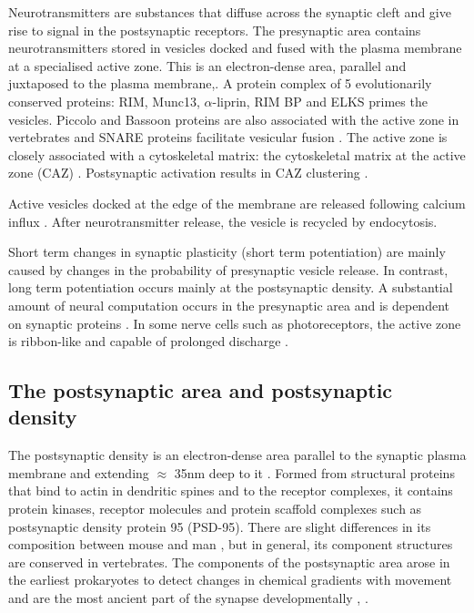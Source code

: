 Neurotransmitters are substances that diffuse across the synaptic cleft and give rise to signal in the postsynaptic receptors. 
 The presynaptic area contains neurotransmitters stored in vesicles docked and fused with the plasma membrane at a specialised active zone. This is an electron-dense area, parallel and juxtaposed to the plasma membrane\cite{schoch2006molecular},\cite{sudhof2012presynaptic}. 
 A protein complex of 5 evolutionarily conserved proteins: RIM, Munc13, $\alpha$-liprin, RIM BP and ELKS \cite{sudhof2012presynaptic} primes the vesicles. Piccolo and Bassoon proteins are also associated with the active zone in vertebrates\cite{gundelfinger2016role} and SNARE proteins facilitate vesicular fusion \cite{sudhof2012presynaptic}. The active zone is closely associated with a cytoskeletal matrix: the cytoskeletal matrix at the active zone (CAZ) \cite{schoch2006molecular}. Postsynaptic activation results in CAZ clustering \cite{glebov2017nanoscale}. 



Active vesicles docked at the edge of the membrane are released following calcium influx \cite{lassek2015synaptic}. After neurotransmitter release, the vesicle is recycled by endocytosis\cite{ashery2014molecular}. 


Short term changes in synaptic plasticity (short term potentiation) are mainly caused by changes in the probability of presynaptic vesicle release. In contrast, long term potentiation occurs mainly at the postsynaptic density.  A substantial amount of neural computation occurs in the presynaptic area and is dependent on synaptic proteins \cite{sudhof2012presynaptic}. In some nerve cells such as photoreceptors, the active zone is ribbon-like and capable of prolonged discharge  \cite{ashery2014molecular}.  
 
 
 
\subsection{The postsynaptic area and postsynaptic density}
\label{sec:post synaptic area and post synaptic density}
The postsynaptic density is an electron-dense area parallel to the synaptic plasma membrane and extending $\approx$ 35nm deep to it \cite{harris2012ultrastructure}. Formed from structural proteins that bind to actin in dendritic spines and to the receptor complexes, it contains protein kinases, receptor molecules and protein scaffold complexes such as postsynaptic density protein 95 (PSD-95). There are slight differences in its composition between mouse and man \cite{bayes2012comparative}, but in general, its component structures are conserved in vertebrates. The components of the postsynaptic area arose in the earliest prokaryotes to detect changes in chemical gradients with movement and are the most ancient part of the synapse developmentally \cite{grant2018synapse}, \cite{emes2012evolution}. 

